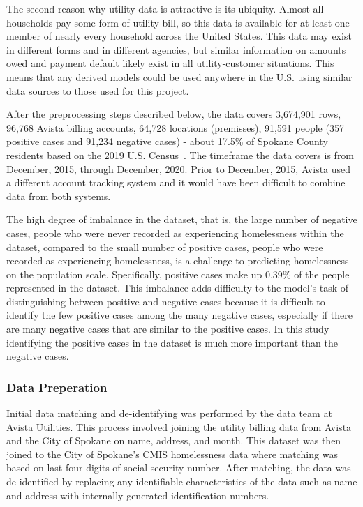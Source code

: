 \documentclass[10pt,letterpaper]{article}
\begin{document}
The second reason why utility data is attractive is its ubiquity. Almost all households pay some form of utility bill, so this data is available for at least one member of nearly every household across the United States. This data may exist in different forms and in different agencies, but similar information on amounts owed and payment default likely exist in all utility-customer situations. This means that any derived models could be used anywhere in the U.S. using similar data sources to those used for this project.

After the preprocessing steps described below, the data covers 3,674,901 rows, 96,768 Avista billing accounts, 64,728 locations (premisses), 91,591 people (357 positive cases and 91,234 negative cases) - about 17.5\% of Spokane County residents based on the 2019 U.S. Census~\cite{SpokanePop}. The timeframe the data covers is from December, 2015, through December, 2020. Prior to December, 2015, Avista used a different account tracking system and it would have been difficult to combine data from both systems. 

The high degree of imbalance in the dataset, that is, the large number of negative cases, people who were never recorded as experiencing homelessness within the dataset, compared to the small number of positive cases, people who were recorded as experiencing homelessness, is a challenge to predicting homelessness on the population scale. Specifically, positive cases make up 0.39\% of the people represented in the dataset. This imbalance adds difficulty to the model's task of distinguishing between positive and negative cases because it is difficult to identify the few positive cases among the many negative cases, especially if there are many negative cases that are similar to the positive cases. In this study identifying the positive cases in the dataset is much more important than the negative cases.

\subsubsection*{Data Preperation}
Initial data matching and de-identifying was performed by the data team at Avista Utilities. This process involved joining the utility billing data from Avista and the City of Spokane on name, address, and month. This dataset was then joined to the City of Spokane's CMIS homelessness data where matching was based on last four digits of social security number. After matching, the data was de-identified by replacing any identifiable characteristics of the data such as name and address with internally generated identification numbers. 
\end{document}
